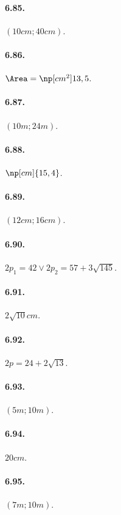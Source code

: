 \begin{multicols}{2}
\paragraph{6.85.} $(10\unit{cm};40\unit{cm})$.

\paragraph{6.86.} $\Area=\np[{cm}^2]{13,5}$.

\paragraph{6.87.} $(10\unit{m};24\unit{m})$.

\paragraph{6.88.} $\np[cm]{15,4}$.

\paragraph{6.89.} $(12\unit{cm};16\unit{cm})$.

\paragraph{6.90.} $2p_1=42\vee 2p_2=57+3\sqrt{145}$.

\paragraph{6.91.} $2\sqrt{10}\unit{cm}$.

\paragraph{6.92.} $2p=24+2\sqrt{13}$.

\paragraph{6.93.} $(5\unit{m};10\unit{m})$.

\paragraph{6.94.} $20\unit{cm}$.

\paragraph{6.95.} $(7\unit{m};10\unit{m})$.


\end{multicols}
